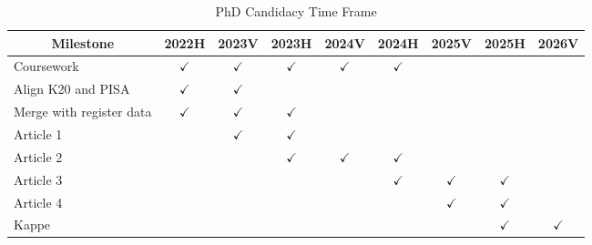 \documentclass[
    a4paper,                %
    11pt,                   %
    stu,                    %
    donotrepeattitle,       %
    floatsintext,           %
    biblatex,               %
    colorlinks=true,        %
    linkcolor=red,          %
    anchorcolor=black,      %
    citecolor=blue,         %
    urlcolor=blue,          %
    bookmarks=true,         %
    bookmarksopen=false,    %
    bookmarksnumbered=true, %
    dvipsnames              %
]{apa7}
\begin{document}
\begin{table}[htbp]
    \begin{threeparttable}
    \caption{PhD Candidacy Time Frame}
    \label{tab:timeframe}
    \begin{tabular}{lcccccccc}
        \toprule
        \multicolumn{1}{c}{Milestone} & 2022H & 2023V & 2023H & 2024V & 2024H & 2025V & 2025H & 2026V \\
        \midrule
        Coursework & $\checkmark$     & $\checkmark$     & $\checkmark$     & $\checkmark$      & $\checkmark$      &       &       &  \\
        Align K20 and PISA & $\checkmark$     & $\checkmark$       &       &       &       &       &       &  \\
        Merge with register data & $\checkmark$     & $\checkmark$     & $\checkmark$       &       &       &       &       &  \\
        Article 1 &       & $\checkmark$     & $\checkmark$     &       &       &       &       &  \\
        Article 2 &       &       & $\checkmark$     & $\checkmark$     & $\checkmark$     &       &       &  \\
        Article 3 &       &       &       &       & $\checkmark$     & $\checkmark$     & $\checkmark$     &  \\
        Article 4 &       &       &       &       &       & $\checkmark$     & $\checkmark$     &  \\
        Kappe &       &       &       &       &       &       & $\checkmark$       & $\checkmark$ \\
        \bottomrule
        \end{tabular}
    \end{threeparttable}
\end{table}

\printbibliography
\end{document}
